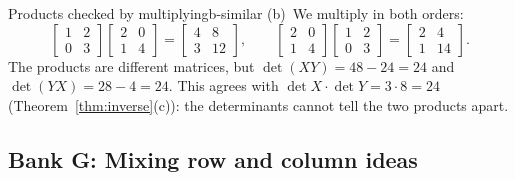 \documentclass[11pt]{article}
\begin{document}
\begin{exmp}{Products checked by multiplying}{b-similar}
(b)~We multiply in both orders:
\[
\begin{bmatrix}1&2\\0&3\end{bmatrix}\begin{bmatrix}2&0\\1&4\end{bmatrix}=\begin{bmatrix}4&8\\3&12\end{bmatrix},\qquad
\begin{bmatrix}2&0\\1&4\end{bmatrix}\begin{bmatrix}1&2\\0&3\end{bmatrix}=\begin{bmatrix}2&4\\1&14\end{bmatrix}.
\]
The products are different matrices, but $\det(XY)=48-24=24$ and $\det(YX)=28-4=24$. This agrees with $\det X\cdot\det Y=3\cdot8=24$ (Theorem~\ref{thm:inverse}(c)): the determinants cannot tell the two products apart.
\end{exmp}

\subsection*{Bank G: Mixing row and column ideas}
\end{document}
